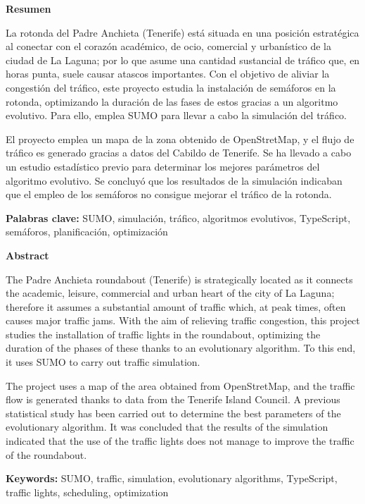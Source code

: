 \pagestyle{empty}

\begin{center}
    \textbf{Resumen}
\end{center}

La rotonda del Padre Anchieta (Tenerife) está situada en una posición estratégica al conectar con el corazón académico, de ocio, comercial y urbanístico de la ciudad de La Laguna; por lo que asume una cantidad sustancial de tráfico que, en horas punta, suele causar atascos importantes. Con el objetivo de aliviar la congestión del tráfico, este proyecto estudia la instalación de semáforos en la rotonda, optimizando la duración de las fases de estos gracias a un algoritmo evolutivo. Para ello, emplea SUMO para llevar a cabo la simulación del tráfico.

\medskip

El proyecto emplea un mapa de la zona obtenido de OpenStretMap, y el flujo de tráfico es generado gracias a datos del Cabildo de Tenerife. Se ha llevado a cabo un estudio estadístico previo para determinar los mejores parámetros del algoritmo evolutivo. Se concluyó que los resultados de la simulación indicaban que el empleo de los semáforos no consigue mejorar el tráfico de la rotonda.

\medskip

\noindent \textbf{Palabras clave:} SUMO, simulación, tráfico, algoritmos evolutivos, TypeScript, semáforos, planificación, optimización

\newpage
\pagestyle{empty}

\bigskip
\bigskip

\begin{center}
    \textbf{Abstract}
\end{center}

The Padre Anchieta roundabout (Tenerife) is strategically located as it connects the academic, leisure, commercial and urban heart of the city of La Laguna; therefore it assumes a substantial amount of traffic which, at peak times, often causes major traffic jams. With the aim of relieving traffic congestion, this project studies the installation of traffic lights in the roundabout, optimizing the duration of the phases of these thanks to an evolutionary algorithm. To this end, it uses SUMO to carry out traffic simulation.

\medskip

The project uses a map of the area obtained from OpenStretMap, and the traffic flow is generated thanks to data from the Tenerife Island Council. A previous statistical study has been carried out to determine the best parameters of the evolutionary algorithm. It was concluded that the results of the simulation indicated that the use of the traffic lights does not manage to improve the traffic of the roundabout.

\medskip

\noindent \textbf{Keywords:} SUMO, traffic, simulation, evolutionary algorithms, TypeScript, traffic lights, scheduling, optimization

